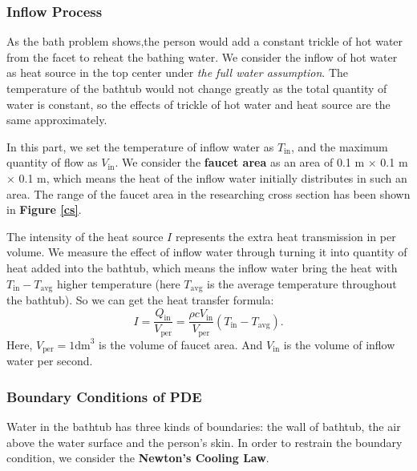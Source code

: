 \documentclass{HZNUMCM}
\begin{document}
\subsubsection{Inflow Process}
As the bath problem shows,the person would add a constant trickle of hot water from the facet to
reheat the bathing water. We consider the inflow of hot water as heat source in the top center under
\emph{the full water assumption}. The temperature of the bathtub would not change greatly as the
total quantity of water is constant, so the effects of trickle of hot water and heat source are the
same approximately.

In this part, we set the temperature of inflow water as $T_\mathrm{in}$, and the maximum quantity of
flow as $V_\mathrm{in}$. We consider the \textbf{faucet area} as an area of 0.1 m $\times$ 0.1 m
$\times$ 0.1 m, which means the heat of the inflow water initially distributes in such an area. The
range of the faucet area in the researching cross section has been shown in \textbf{Figure
\ref{cs}}.

The intensity of the heat source $I$ represents the extra heat transmission in per volume. We
measure the effect of inflow water through turning it into quantity of heat added into the bathtub,
which means the inflow water bring the heat with $T_\mathrm{in}-T_\mathrm{avg}$ higher temperature
(here $T_\mathrm{avg}$ is the average temperature throughout the bathtub). So we can get the heat
transfer formula:
\begin{equation}
I=\frac{Q_\mathrm{in}}{V_\mathrm{per}}=\frac{\rho cV_\mathrm{in}}{V_\mathrm{per}}
(T_\mathrm{in}-T_\mathrm{avg}).
\end{equation}
Here, $V_\mathrm{per}=1\mathrm{dm}^3$ is the volume of faucet area. And $V_\mathrm{in}$ is the
volume of inflow water per second.

\subsubsection{Boundary Conditions of PDE}
Water in the bathtub has three kinds of boundaries: the wall of bathtub, the air above the water
surface and the person's skin. In order to restrain the boundary condition, we consider the
\textbf{Newton's Cooling Law}.
\end{document}
